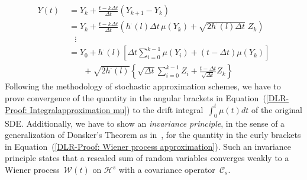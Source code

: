 \begin{align}
    Y(t) & \; = Y_k + \frac{t - k \Delta t}{\Delta t} (Y_{k+1} - Y_k) \nonumber  \\
    & \; = Y_k + \frac{t - k \Delta t}{\Delta t} (h^{\cdot}(l) \Delta t \, \mu(Y_k) +\sqrt{2h^{\cdot}(l) \Delta t } \; Z_k ) \nonumber \\
    & \quad \vdots \nonumber \\
    & \; = Y_0 + h^{\cdot}(l) \left[ \Delta t \sum_{i=0}^{k-1} \mu(Y_i) + (t - \Delta t) \mu(Y_k) \right] \label{DLR-Proof: Integralapproximation mu} \\ 
    & \qquad + \sqrt{2 h^{\cdot}(l)} \left\{ \sqrt{ \Delta t} \sum_{i=0}^{k-1} Z_i +  \frac{t - \Delta t}{\sqrt{\Delta t}} Z_k \right\} \label{DLR-Proof: Wiener process approximation}
\end{align}
Following the methodology of stochastic approximation schemes, we have to prove convergence of the quantity in the angular brackets in Equation~(\ref{DLR-Proof: Integralapproximation mu}) to the drift integral~$\int_0^t \mu (t) dt$ of the original SDE. Additionally, we have to show an \textit{invariance principle}, in the sense of a generalization of Donsker's Theorem as in~\autocite{Revuz2005}, for the quantity in the curly brackets in Equation~(\ref{DLR-Proof: Wiener process approximation}). Such an invariance principle states  that a rescaled sum of random variables converges weakly to a Wiener process~$\mathcal{W}(t)$ on $\mathcal{H}^s$ with a covariance operator~$\mathcal{C}_s$. 




